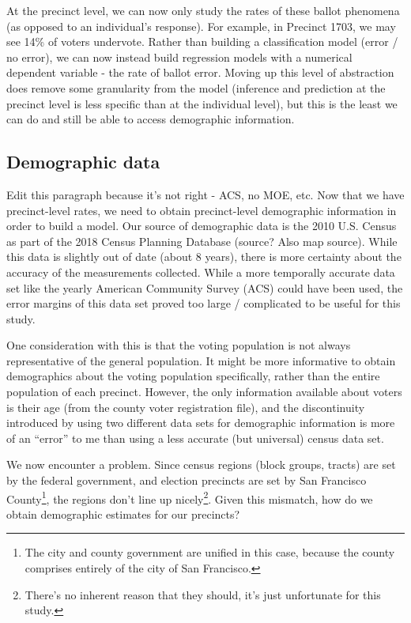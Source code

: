 \documentclass[12pt,twoside]{reedthesis}
\theoremstyle{definition}
\theoremstyle{definition}
\theoremstyle{definition}
\theoremstyle{remark}
\begin{document}
At the precinct level, we can now only study the rates of these ballot
phenomena (as opposed to an individual's response). For example, in
Precinct 1703, we may see 14\% of voters undervote. Rather than building
a classification model (error / no error), we can now instead build
regression models with a numerical dependent variable - the rate of
ballot error. Moving up this level of abstraction does remove some
granularity from the model (inference and prediction at the precinct
level is less specific than at the individual level), but this is the
least we can do and still be able to access demographic information.

\hypertarget{demographic-data}{%
\subsection{Demographic data}\label{demographic-data}}

Edit this paragraph because it's not right - ACS, no MOE, etc. Now that
we have precinct-level rates, we need to obtain precinct-level
demographic information in order to build a model. Our source of
demographic data is the 2010 U.S. Census as part of the 2018 Census
Planning Database (source? Also map source). While this data is slightly
out of date (about 8 years), there is more certainty about the accuracy
of the measurements collected. While a more temporally accurate data set
like the yearly American Community Survey (ACS) could have been used,
the error margins of this data set proved too large / complicated to be
useful for this study.

One consideration with this is that the voting population is not always
representative of the general population. It might be more informative
to obtain demographics about the voting population specifically, rather
than the entire population of each precinct. However, the only
information available about voters is their age (from the county voter
registration file), and the discontinuity introduced by using two
different data sets for demographic information is more of an ``error''
to me than using a less accurate (but universal) census data set.

We now encounter a problem. Since census regions (block groups, tracts)
are set by the federal government, and election precincts are set by San
Francisco County\footnote{The city and county government are unified in
  this case, because the county comprises entirely of the city of San
  Francisco.}, the regions don't line up nicely\footnote{There's no
  inherent reason that they should, it's just unfortunate for this
  study.}. Given this mismatch, how do we obtain demographic estimates
for our precincts?
\end{document}
